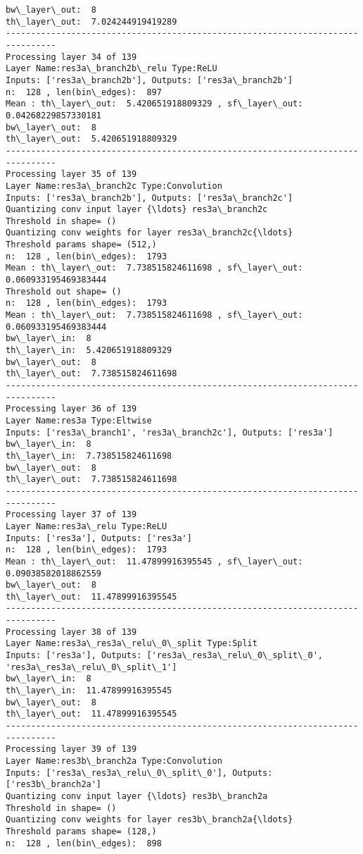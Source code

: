 \documentclass[11pt]{article}
\begin{document}
\begin{Verbatim}[commandchars=\\\{\}]
bw\_layer\_out:  8
th\_layer\_out:  7.024244919419289
--------------------------------------------------------------------------------
Processing layer 34 of 139
Layer Name:res3a\_branch2b\_relu Type:ReLU
Inputs: ['res3a\_branch2b'], Outputs: ['res3a\_branch2b']
n:  128 , len(bin\_edges):  897
Mean : th\_layer\_out:  5.420651918809329 , sf\_layer\_out:  0.04268229857330181
bw\_layer\_out:  8
th\_layer\_out:  5.420651918809329
--------------------------------------------------------------------------------
Processing layer 35 of 139
Layer Name:res3a\_branch2c Type:Convolution
Inputs: ['res3a\_branch2b'], Outputs: ['res3a\_branch2c']
Quantizing conv input layer {\ldots} res3a\_branch2c
Threshold in shape= ()
Quantizing conv weights for layer res3a\_branch2c{\ldots}
Threshold params shape= (512,)
n:  128 , len(bin\_edges):  1793
Mean : th\_layer\_out:  7.738515824611698 , sf\_layer\_out:  0.060933195469383444
Threshold out shape= ()
n:  128 , len(bin\_edges):  1793
Mean : th\_layer\_out:  7.738515824611698 , sf\_layer\_out:  0.060933195469383444
bw\_layer\_in:  8
th\_layer\_in:  5.420651918809329
bw\_layer\_out:  8
th\_layer\_out:  7.738515824611698
--------------------------------------------------------------------------------
Processing layer 36 of 139
Layer Name:res3a Type:Eltwise
Inputs: ['res3a\_branch1', 'res3a\_branch2c'], Outputs: ['res3a']
bw\_layer\_in:  8
th\_layer\_in:  7.738515824611698
bw\_layer\_out:  8
th\_layer\_out:  7.738515824611698
--------------------------------------------------------------------------------
Processing layer 37 of 139
Layer Name:res3a\_relu Type:ReLU
Inputs: ['res3a'], Outputs: ['res3a']
n:  128 , len(bin\_edges):  1793
Mean : th\_layer\_out:  11.47899916395545 , sf\_layer\_out:  0.09038582018862559
bw\_layer\_out:  8
th\_layer\_out:  11.47899916395545
--------------------------------------------------------------------------------
Processing layer 38 of 139
Layer Name:res3a\_res3a\_relu\_0\_split Type:Split
Inputs: ['res3a'], Outputs: ['res3a\_res3a\_relu\_0\_split\_0', 'res3a\_res3a\_relu\_0\_split\_1']
bw\_layer\_in:  8
th\_layer\_in:  11.47899916395545
bw\_layer\_out:  8
th\_layer\_out:  11.47899916395545
--------------------------------------------------------------------------------
Processing layer 39 of 139
Layer Name:res3b\_branch2a Type:Convolution
Inputs: ['res3a\_res3a\_relu\_0\_split\_0'], Outputs: ['res3b\_branch2a']
Quantizing conv input layer {\ldots} res3b\_branch2a
Threshold in shape= ()
Quantizing conv weights for layer res3b\_branch2a{\ldots}
Threshold params shape= (128,)
n:  128 , len(bin\_edges):  898

\end{Verbatim}
\end{document}
